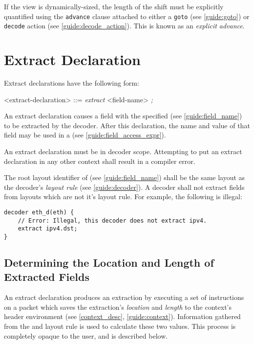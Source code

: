 If the view is dynamically-sized, the length of the shift must be explicitly quantified using the \texttt{\color{blue}advance} clause attached to either a \texttt{goto} (see \ref{guide:goto}) or \texttt{decode} action (see \ref{guide:decode_action}). This is known as an \textit{explicit advance}.

\section{Extract Declaration} \label{guide:extract}

Extract declarations have the following form:

\begin{grammar}
<extract-declaration> ::=
\textit{extract} <field-name> \textit{;}
\end{grammar}

An extract declaration causes a field with the specified  (see \ref{guide:field_name}) to be extracted by the decoder. After this declaration, the name and value of that field may be used in a  (see \ref{guide:field_access_expr}).

An extract declaration must be in decoder scope. Attempting to put an extract declaration in any other context shall result in a compiler error.

The root layout identifier of  (see \ref{guide:field_name}) shall be the same layout as the decoder's \textit{layout rule} (see \ref{guide:decoder}). A decoder shall not extract fields from layouts which are not it's layout rule. For example, the following is illegal:

\begin{minip}
\begin{lstlisting}
decoder eth_d(eth) {
	// Error: Illegal, this decoder does not extract ipv4.
	extract ipv4.dst; 
}
\end{lstlisting}
\end{minip}

\subsection{Determining the Location and Length of Extracted Fields}

An extract declaration produces an extraction by executing a set of instructions on a packet which saves the extraction's \textit{location} and \textit{length} to the context's header environment (see \ref{context_desc}, \ref{guide:context}). Information gathered from the  and layout rule is used to calculate these two values. This process is completely opaque to the user, and is described below.


